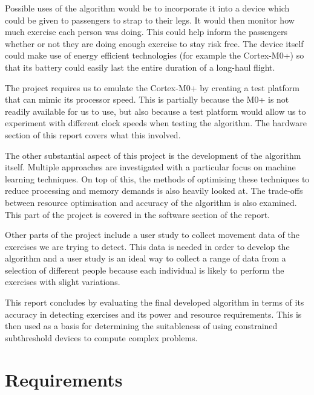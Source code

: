 Possible uses of the algorithm would be to incorporate it into a device which could be given to passengers to strap to their legs. It would then monitor how much exercise each person was doing. This could help inform the passengers whether or not they are doing enough exercise to stay risk free. The device itself could make use of energy efficient technologies (for example the Cortex-M0+) so that its battery could easily last the entire duration of a long-haul flight.

The project requires us to emulate the Cortex-M0+ by creating a test platform that can mimic its processor speed. This is partially because the M0+ is not readily available for us to use, but also because a test platform would allow us to experiment with different clock speeds when testing the algorithm. The hardware section of this report covers what this involved.

The other substantial aspect of this project is the development of the algorithm itself. Multiple approaches are investigated with a particular focus on machine learning techniques. On top of this, the methods of optimising these techniques to reduce processing and memory demands is also heavily looked at. The trade-offs between resource optimisation and accuracy of the algorithm is also examined.  This part of the project is covered in the software section of the report.

Other parts of the project include a user study to collect movement data of the exercises we are trying to detect. This data is needed in order to develop the algorithm and a user study is an ideal way to collect a range of data from a selection of different people because each individual is likely to perform the exercises with slight variations.

This report concludes by evaluating the final developed algorithm in terms of its accuracy in detecting exercises and its power and resource requirements. This is then used as a basis for determining the suitableness of using constrained subthreshold devices to compute complex problems.


\section{Requirements}

